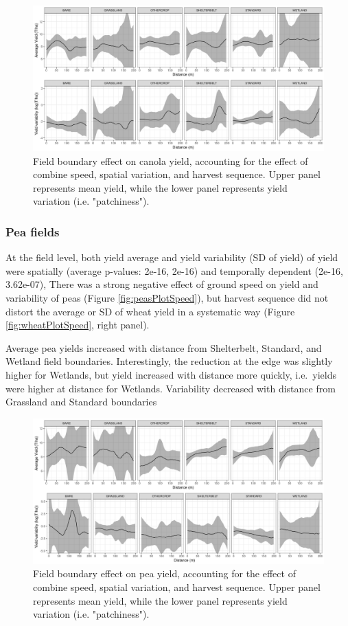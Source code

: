 \documentclass[]{elsarticle} %
\begin{document}
\begin{figure}
\includegraphics[width=1\linewidth]{../Figures/ModelSummary3a_wheat} \caption{Field boundary effect on canola yield, accounting for the effect of combine speed, spatial variation, and harvest sequence. Upper panel represents mean yield, while the lower panel represents yield variation (i.e. "patchiness").}\label{fig:wheatPlot}
\end{figure}

\hypertarget{pea-fields}{%
\subsubsection{Pea fields}\label{pea-fields}}

At the field level, both yield average and yield variability (SD of yield) of yield were spatially (average p-values: 2e-16, 2e-16) and temporally dependent (2e-16, 3.62e-07),
There was a strong negative effect of ground speed on yield and variability of peas (Figure \ref{fig:peasPlotSpeed}), but harvest sequence did not distort the average or SD of wheat yield in a systematic way (Figure \ref{fig:wheatPlotSpeed}, right panel).

Average pea yields increased with distance from Shelterbelt, Standard, and Wetland field boundaries.
Interestingly, the reduction at the edge was slightly higher for Wetlands, but yield increased with distance more quickly, i.e.~yields were higher at distance for Wetlands.
Variability decreased with distance from Grassland and Standard boundaries

\begin{figure}
\includegraphics[width=1\linewidth]{../Figures/ModelSummary3a_peas} \caption{Field boundary effect on pea yield, accounting for the effect of combine speed, spatial variation, and harvest sequence. Upper panel represents mean yield, while the lower panel represents yield variation (i.e. "patchiness").}\label{fig:peaPlot}
\end{figure}
\end{document}
